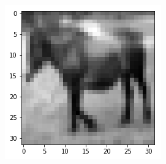 \begin{figure}[H]
\begin{subfigure}{.3\linewidth}
\end{subfigure}
   \hfill
\begin{subfigure}{.3\linewidth}
    \centering
    \includegraphics[scale=0.4]{chapter_3_figures/interp4.png}
\end{subfigure}


\end{figure}
